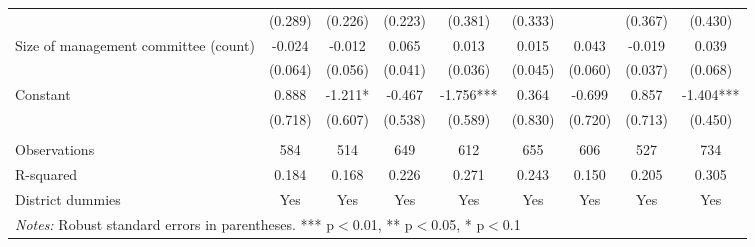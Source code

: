 \documentclass[11pt]{article}
\begin{document}
\begin{landscape}
\begin{table}[H]
{\begin{tabularx}{1.8\linewidth}{lcccccccc}
 & (0.289) & (0.226) & (0.223) & (0.381) & (0.333) &  & (0.367) & (0.430) \\
Size of management committee (count) & -0.024 & -0.012 & 0.065 & 0.013 & 0.015 & 0.043 & -0.019 & 0.039 \\
 & (0.064) & (0.056) & (0.041) & (0.036) & (0.045) & (0.060) & (0.037) & (0.068) \\
Constant & 0.888 & -1.211* & -0.467 & -1.756*** & 0.364 & -0.699 & 0.857 & -1.404*** \\
 & (0.718) & (0.607) & (0.538) & (0.589) & (0.830) & (0.720) & (0.713) & (0.450) \\
 &  &  &  &  &  &  &  &  \\
Observations & 584 & 514 & 649 & 612 & 655 & 606 & 527 & 734 \\
R-squared & 0.184 & 0.168 & 0.226 & 0.271 & 0.243 & 0.150 & 0.205 & 0.305 \\
 District dummies & Yes & Yes & Yes & Yes & Yes & Yes & Yes & Yes \\ \hline
\multicolumn{9}{l}{\textit{Notes:} Robust standard errors in parentheses. *** p$<$0.01, ** p$<$0.05, * p$<$0.1} \\
  \end{tabularx}}
\end{table}
\doublespacing

\end{landscape}

\newpage

\end{document}
